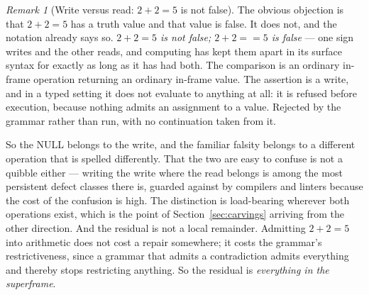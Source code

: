 \documentclass[11pt,a4paper]{article}
\theoremstyle{remark}\newtheorem{remark}[definition]{Remark}
\begin{document}
\begin{remark}[Write versus read: $2+2=5$ is not false]\label{rem:write-versus-read}
The obvious objection is that $2+2=5$ has a truth value and that value is false. It does not, and the
notation already says so. \emph{$2+2=5$ is not false; $2+2{=}{=}5$ is false} --- one sign writes and
the other reads, and computing has kept them apart in its surface syntax for exactly as long as it has
had both. The comparison is an ordinary in-frame operation returning an ordinary in-frame value. The
assertion is a write, and in a typed setting it does not evaluate to anything at all: it is refused
before execution, because nothing admits an assignment to a value. Rejected by the grammar rather than
run, with no continuation taken from it.

So the NULL belongs to the write, and the familiar falsity belongs to a different operation that is
spelled differently. That the two are easy to confuse is not a quibble either --- writing the write
where the read belongs is among the most persistent defect classes there is, guarded against by
compilers and linters because the cost of the confusion is high. The distinction is load-bearing
wherever both operations exist, which is the point of Section~\ref{sec:carvings} arriving from the
other direction. And the residual is not a local remainder. Admitting $2+2=5$ into arithmetic
does not cost a repair somewhere; it costs the grammar's restrictiveness, since a grammar that admits
a contradiction admits everything and thereby stops restricting anything. So the residual is
\emph{everything in the superframe}.
\end{remark}
\end{document}

